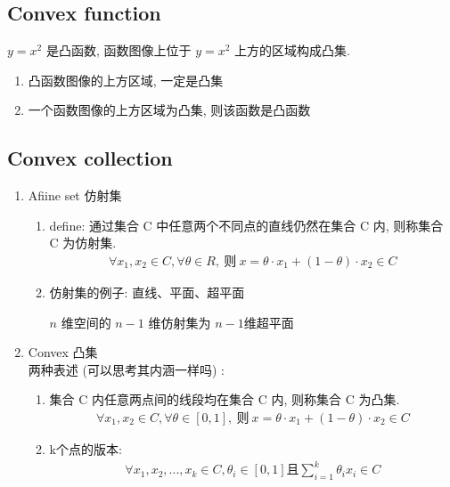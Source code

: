 \documentclass[oneside, 12pt]{ctexbook}
\begin{document}
			\subsection{\quad Convex function}
				$y = x^2$ 是凸函数, 函数图像上位于 $y = x^2$ 上方的区域构成凸集.
				\begin{enumerate}
					\item 凸函数图像的上方区域, 一定是凸集
							
					\item 一个函数图像的上方区域为凸集, 则该函数是凸函数
				\end{enumerate}
		
			\subsection{\quad Convex collection}
				\begin{enumerate}
					\item Afiine set 仿射集
						\begin{enumerate}
							\item define: 通过集合 C 中任意两个不同点的直线仍然在集合 C 内, 则称集合 C 为仿射集.
							 	\begin{align}
							 		\forall x_1, x_2 \in C, \forall \theta \in R, \ \text{则} \ x = \theta \cdot x_1 + (1 - \theta) \cdot x_2 \in C
							 	\end{align}
							 	
							 \item 仿射集的例子: 直线、平面、超平面
							 
							 	$n$ 维空间的 $n-1$ 维仿射集为 $n-1$维超平面
						\end{enumerate}
					
					\item Convex 凸集\\
						两种表述 (可以思考其内涵一样吗) :
						\begin{enumerate}
							\item 集合 C 内任意两点间的线段均在集合 C 内, 则称集合 C 为凸集.
								\begin{align}
									\forall x_1, x_2 \in C, \forall \theta \in \left[ 0, 1 \right], \ \text{则} \ x = \theta \cdot x_1 + (1 - \theta) \cdot x_2 \in C
								\end{align}
								
							\item k个点的版本:
								\begin{align}
									\forall x_1, x_2, ..., x_k \in C, \theta_i \in [0,1] \text{且} \sum_{i=1}^{k} \theta_i x_i \in C
								\end{align}
						\end{enumerate}
					

\end{enumerate}
\end{document}
